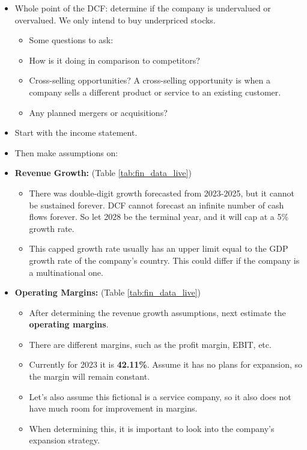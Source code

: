 \begin{itemize}
    \item Whole point of the DCF: determine if the company is undervalued or overvalued. We only intend to buy underpriced stocks.
    \begin{itemize}
        \item Some questions to ask:
        \item How is it doing in comparison to competitors?
        \item Cross-selling opportunities? A cross-selling opportunity is when a company sells a different product or service to an existing customer.
        \item Any planned mergers or acquisitions?
    \end{itemize}
    \item Start with the income statement.
    \item Then make assumptions on:
    \item \textbf{Revenue Growth: } (Table \ref{tab:fin_data_live})
        \begin{itemize}
            \item There was double-digit growth forecasted from 2023-2025, but it cannot be sustained forever. DCF cannot forecast an infinite number of cash flows forever. So let 2028 be the terminal year, and it will cap at a 5\% growth rate.
            \item This capped growth rate usually has an upper limit equal to the GDP growth rate of the company's country. This could differ if the company is a multinational one.
        \end{itemize}
    \item \textbf{Operating Margins: } (Table \ref{tab:fin_data_live})
        \begin{itemize}
            \item After determining the revenue growth assumptions, next estimate the \textbf{operating margins}.
            \item  There are different margins, such as the profit margin, EBIT, etc.
            \item Currently for 2023 it is \textbf{42.11\%}. Assume it has no plans for expansion, so the margin will remain constant.
            \item Let's also assume this fictional is a service company, so it also does not have much room for improvement in margins.
            \item When determining this, it is important to look into the company's expansion strategy.

\end{itemize}
\end{itemize}
